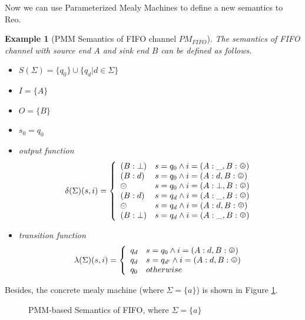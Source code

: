 \documentclass[conference, a4paper]{IEEEtran}
\newtheorem{example}{Example}
\newcommand{\rblock}[0]{\circleddash}
\newcommand{\rread}[0]{\smiley}
\newcommand{\rnoread}[0]{\frownie}
\begin{document}
Now we can use Parameterized Mealy Machines to define a new semantics to Reo.
\begin{example}[PMM Semantics of FIFO channel $PM_{FIFO}$]
  \label{example:pmmfifo}
  The semantics of FIFO channel with source end $A$ and sink end $B$ can be defined as follows.
  \begin{itemize}
    \item[-] $S(\Sigma)=\{q_0\}\cup\{q_d|d\in\Sigma\}$
    \item[-] $I=\{A\}$
    \item[-] $O=\{B\}$
    \item[-] $s_0=q_0$
    \item[-] output function
      \begin{displaymath}
        \delta(\Sigma)(s,i)=\left\{
        \begin{array}[h]{ll}
          (B:\bot) & s=q_0\land i=(A:\_,B:\rnoread) \\
          (B:d) & s=q_0\land i=(A:d,B:\rread)\\
          \rblock & s=q_0\land i=(A:\bot,B:\rread) \\
          (B:d) & s=q_d\land i=(A:\_,B:\rread)\\
          \rblock & s=q_d\land i=(A:d,B:\rnoread) \\
          (B:\bot) & s=q_d\land i=(A:\_,B:\rnoread) \\     
        \end{array}
        \right.
      \end{displaymath}
    \item[-] transition function
      \begin{displaymath}
        \lambda(\Sigma)(s,i)=\left\{
        \begin{array}[h]{ll}
          q_d & s=q_0\land i=(A:d,B:\rnoread) \\
          q_d & s=q_{d'}\land i=(A:d,B:\rread) \\
          q_0 & otherwise \\
        \end{array}
        \right.
      \end{displaymath}
  \end{itemize}
\end{example}

Besides, the concrete mealy machine (where $\Sigma=\{a\}$) is shown in Figure \ref{fig:pmmfifo}.
\begin{figure}[h]
  \begin{center}
    
  \end{center}
  \caption{PMM-based Semantics of FIFO, where $\Sigma=\{a\}$}
  \label{fig:pmmfifo}
\end{figure}
\end{document}
